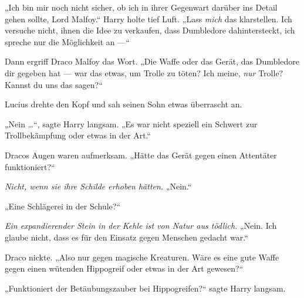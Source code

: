 „Ich bin mir noch nicht sicher, ob ich in ihrer Gegenwart darüber ins Detail gehen sollte, Lord Malfoy.“
Harry holte tief Luft.
„Lass \emph{mich} das klarstellen. Ich versuche nicht, ihnen die Idee zu verkaufen, dass Dumbledore dahintersteckt, ich spreche nur die Möglichkeit an —“

Dann ergriff Draco Malfoy das Wort.
„Die Waffe oder das Gerät, das Dumbledore dir gegeben hat — war das etwas, um Trolle zu töten? Ich meine, \emph{nur} Trolle? Kannst du uns das sagen?“

Lucius drehte den Kopf und sah seinen Sohn etwas überrascht an.

„Nein …“, sagte Harry langsam.
„Es war nicht speziell ein Schwert zur Trollbekämpfung oder etwas in der Art.“

Dracos Augen waren aufmerksam.
„Hätte das Gerät gegen einen Attentäter funktioniert?“

\emph{Nicht, wenn sie ihre Schilde erhoben hätten.}
„Nein.“

„Eine Schlägerei in der Schule?“

\emph{Ein expandierender Stein in der Kehle ist von Natur aus tödlich.}
„Nein. Ich glaube nicht, dass es für den Einsatz gegen Menschen gedacht war.“

Draco nickte.
„Also nur gegen magische Kreaturen. Wäre es eine gute Waffe gegen einen wütenden Hippogreif oder etwas in der Art gewesen?“

„Funktioniert der Betäubungszauber bei Hippogreifen?“ sagte Harry langsam.


